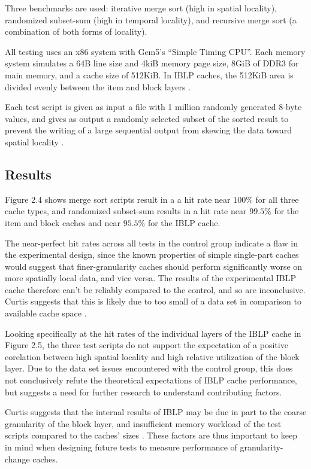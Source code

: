 \documentclass[12pt,twoside]{reedthesis}
\begin{document}
	Three benchmarks are used: iterative merge sort (high in spatial locality), randomized subset-sum (high in temporal locality), and recursive merge sort (a combination of both forms of locality).
	
	All testing uses an x86 system with Gem5's ``Simple Timing CPU''. Each memory system simulates a 64B line size and 4kiB memory page size, 8GiB of DDR3 for main memory, and a cache size of 512KiB. In IBLP caches, the 512KiB area is divided evenly between the item and block layers \cite{curtis}.

	Each test script is given as input a file with 1 million randomly generated 8-byte values, and gives as output a randomly selected subset of the sorted result to prevent the writing of a large sequential output from skewing the data toward spatial locality \cite{curtis}.

	\subsection*{Results}

	Figure 2.4 shows merge sort scripts result in a a hit rate near $100\%$ for all three cache types, and randomized subset-sum results in a hit rate near $99.5\%$ for the item and block caches and near $95.5\%$ for the IBLP cache.
	
	The near-perfect hit rates across all tests in the control group indicate a flaw in the experimental design, since the known properties of simple single-part caches would suggest that finer-granularity caches should perform significantly worse on more spatially local data, and vice versa. The results of the experimental IBLP cache therefore can't be reliably compared to the control, and so are inconclusive. Curtis suggests that this is likely due to too small of a data set in comparison to available cache space \cite{curtis}.

	Looking specifically at the hit rates of the individual layers of the IBLP cache in Figure 2.5, the three test scripts do not support the expectation of a positive corelation between high spatial locality and high relative utilization of the block layer. Due to the data set issues encountered with the control group, this does not conclusively refute the theoretical expectations of IBLP cache performance, but suggests a need for further research to understand contributing factors.
	
	Curtis suggests that the internal results of IBLP may be due in part to the coarse granularity of the block layer, and insufficient memory workload of the test scripts compared to the caches' sizes \cite{curtis}. These factors are thus important to keep in mind when designing future tests to measure performance of granularity-change caches.
\end{document}
